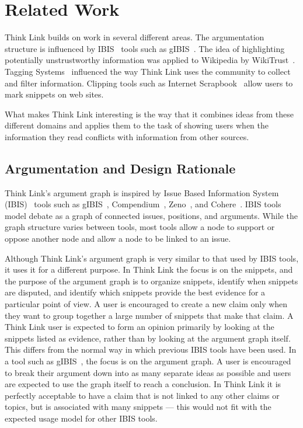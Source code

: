 \documentclass{chi2009}
\newcommand{\todo}[1]{}
\begin{document}
\section{Related Work}
\todo{Don't cite things that aren't relevant}

Think Link builds on work in several different areas. The argumentation structure is influenced by IBIS~\cite{Rittel1973} tools such as gIBIS~\cite{Conklin1987a}. The idea of highlighting potentially unstrustworthy information was applied to Wikipedia by WikiTrust~\cite{Adler2008a}. Tagging Systems~\cite{Marlow2006} influenced the way Think Link uses the community to collect and filter information. Clipping tools such as Internet Scrapbook~\cite{Sugiura1998} allow users to mark snippets on web sites. 

What makes Think Link interesting is the way that it combines ideas from these different domains and applies them to the task of showing users when the information they read conflicts with information from other sources.
\todo{rewrite this?}

\subsection{Argumentation and Design Rationale}

Think Link's argument graph is inspired by Issue Based Information System (IBIS)~\cite{Rittel1973} tools such as gIBIS~\cite{Conklin1987a}, Compendium~\cite{Selvin2001}, Zeno~\cite{Gordon1997}, and Cohere~\cite{Shum2008}. IBIS tools model debate as a graph of connected issues, positions, and arguments. While the graph structure varies between tools, most tools allow a node to support or oppose another node and allow a node to be linked to an issue.

Although Think Link's argument graph is very similar to that used by IBIS tools, it uses it for a different purpose. In Think Link the focus is on the snippets, and the purpose of the argument graph is to organize snippets, identify when snippets are disputed, and identify which snippets provide the best evidence for a particular point of view. A user is encouraged to create a new claim only when they want to group together a large number of snippets that make that claim. A Think Link user is expected to form an opinion primarily by looking at the snippets listed as evidence, rather than by looking at the argument graph itself. This differs from the normal way in which previous IBIS tools have been used. In a tool such as gIBIS~\cite{Conklin1987a}, the focus is on the argument graph. A user is encouraged to break their argument down into as many separate ideas as possible and users are expected to use the graph itself to reach a conclusion. In Think Link it is perfectly acceptable to have a claim that is not linked to any other claims or topics, but is associated with many snippets --- this would not fit with the expected usage model for other IBIS tools.
\end{document}
